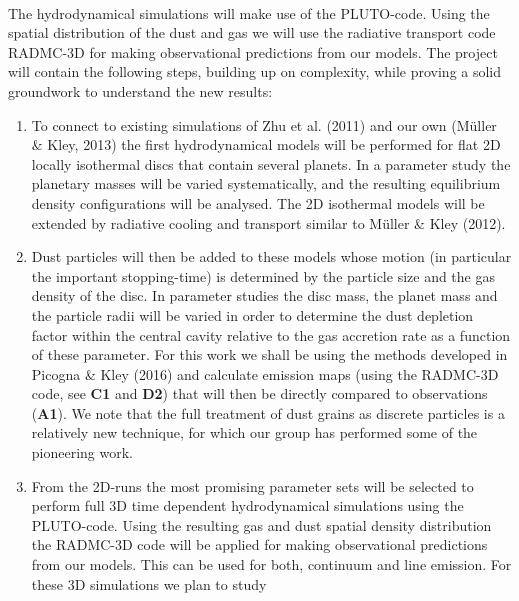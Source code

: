 \vspace{0.5em}
\\
%
The hydrodynamical simulations will make use of the {PLUTO}-code.
Using the spatial distribution of the dust and gas we will use the radiative transport
code RADMC-3D for making observational predictions from our models.
The project will contain the following steps, building up on
complexity, while proving a solid groundwork to understand the new results:
\begin{enumerate}
 \item To connect to existing simulations of Zhu et al. (2011) and our own (M\"uller \& Kley, 2013)
   the first hydrodynamical models will be performed for flat 2D locally isothermal discs that
   contain several planets. In a parameter study the planetary masses will be varied systematically, 
   and the resulting equilibrium density configurations will be analysed. The 2D isothermal models will
   be extended by radiative cooling and transport similar to M\"uller \& Kley (2012).
\item Dust particles will then be added to these models whose motion (in particular the important stopping-time) 
   is determined by the particle size and the gas density of the disc. In parameter studies 
   the disc mass, the planet mass and the particle radii will be varied in order to
   determine the dust depletion factor within the central cavity relative to the gas accretion rate as a
   function of these parameter. For this work we shall be using the methods developed in Picogna \& Kley (2016)
   and calculate emission maps (using the RADMC-3D code, see {\bf C1} and  {\bf D2})
   that will then be directly compared to observations ({\bf A1}). We
   note that the full treatment of dust grains as discrete particles
   is a relatively new technique, for which our group has performed some of the
   pioneering work. 
\item From the 2D-runs the most promising parameter sets will be selected to perform full 3D time dependent
   hydrodynamical simulations using the {PLUTO}-code.
   Using the resulting gas and dust spatial density distribution
   the RADMC-3D code will be applied for making observational predictions from our models.
   This can be used for both, continuum and line emission. For these 3D simulations we plan to study

\end{enumerate}
